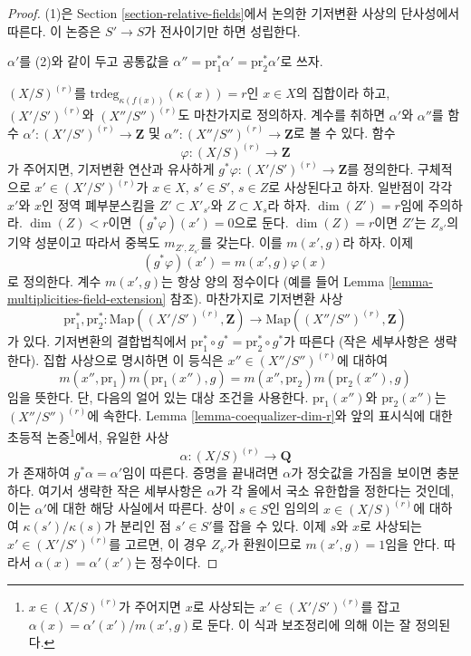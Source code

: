 \begin{proof}
(1)은 Section \ref{section-relative-fields}에서 논의한 기저변환 사상의
단사성에서 따른다. 이 논증은 $S' \to S$가 전사이기만 하면 성립한다.

\medskip\noindent
$\alpha'$를 (2)와 같이 두고 공통값을
$\alpha'' = \text{pr}_1^*\alpha' = \text{pr}_2^*\alpha'$로 쓰자.

\medskip\noindent
$(X/S)^{(r)}$를 $\text{trdeg}_{\kappa(f(x))}(\kappa(x)) = r$인
$x \in X$의 집합이라 하고, $(X'/S')^{(r)}$와 $(X''/S'')^{(r)}$도
마찬가지로 정의하자. 계수를 취하면 $\alpha'$와 $\alpha''$를 함수
$\alpha' : (X'/S')^{(r)} \to \mathbf{Z}$ 및
$\alpha'' : (X''/S'')^{(r)} \to \mathbf{Z}$로 볼 수 있다.
함수
$$
\varphi : (X/S)^{(r)} \to \mathbf{Z}
$$
가 주어지면, 기저변환 연산과 유사하게
$g^*\varphi : (X'/S')^{(r)} \to \mathbf{Z}$를 정의한다.
구체적으로 $x' \in (X'/S')^{(r)}$가 $x \in X$, $s' \in S'$,
$s \in Z$로 사상된다고 하자. 일반점이 각각 $x'$와 $x$인
정역 폐부분스킴을 $Z' \subset X'_{s'}$와 $Z \subset X_s$라 하자.
$\dim(Z') = r$임에 주의하라. $\dim(Z) < r$이면
$(g^*\varphi)(x') = 0$으로 둔다. $\dim(Z) = r$이면 $Z'$는
$Z_{s'}$의 기약 성분이고 따라서 중복도 $m_{Z', Z_{s'}}$를 갖는다.
이를 $m(x', g)$라 하자. 이제
$$
(g^*\varphi)(x') = m(x', g) \varphi(x)
$$
로 정의한다. 계수 $m(x', g)$는 항상 양의 정수이다
(예를 들어 Lemma \ref{lemma-multiplicities-field-extension} 참조).
마찬가지로 기저변환 사상
$$
\text{pr}_1^*, \text{pr}_2^* :
\text{Map}((X'/S')^{(r)}, \mathbf{Z})
\longrightarrow
\text{Map}((X''/S'')^{(r)}, \mathbf{Z})
$$
가 있다. 기저변환의 결합법칙에서
$\text{pr}_1^* \circ g^* = \text{pr}_2^* \circ g^*$가 따른다
(작은 세부사항은 생략한다). 집합 사상으로 명시하면 이 등식은
$x'' \in (X''/S'')^{(r)}$에 대하여
$$
m(x'', \text{pr}_1) m(\text{pr}_1(x''), g) =
m(x'', \text{pr}_2) m(\text{pr}_2(x''), g)
$$
임을 뜻한다. 단, 다음의 얼어 있는 대상 조건을 사용한다.
$\text{pr}_1(x'')$와 $\text{pr}_2(x'')$는
$(X''/S'')^{(r)}$에 속한다.
Lemma \ref{lemma-coequalizer-dim-r}와 앞의 표시식에 대한 초등적
논증\footnote{$x \in (X/S)^{(r)}$가 주어지면 $x$로 사상되는
$x' \in (X'/S')^{(r)}$를 잡고
$\alpha(x) = \alpha'(x')/m(x', g)$로 둔다. 이 식과 보조정리에 의해
이는 잘 정의된다.}에서, 유일한 사상
$$
\alpha : (X/S)^{(r)} \to \mathbf{Q}
$$
가 존재하여 $g^*\alpha = \alpha'$임이 따른다. 증명을 끝내려면
$\alpha$가 정숫값을 가짐을 보이면 충분하다. 여기서 생략한 작은
세부사항은 $\alpha$가 각 올에서 국소 유한합을 정한다는 것인데,
이는 $\alpha'$에 대한 해당 사실에서 따른다. 상이 $s \in S$인
임의의 $x \in (X/S)^{(r)}$에 대하여
$\kappa(s')/\kappa(s)$가 분리인 점 $s' \in S'$를 잡을 수 있다.
이제 $s$와 $x$로 사상되는 $x' \in (X'/S')^{(r)}$를 고르면,
이 경우 $Z_{s'}$가 환원이므로 $m(x', g) = 1$임을 안다.
따라서 $\alpha(x) = \alpha'(x')$는 정수이다.
\end{proof}

